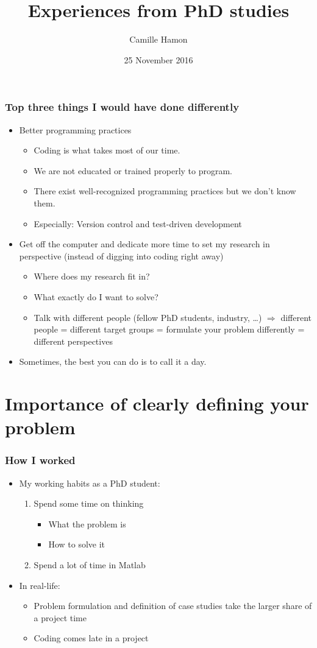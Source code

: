 \documentclass[screen, aspectratio=43]{beamer}
\title{Experiences from PhD studies}
\author{Camille Hamon}
\date{25 November 2016}
\begin{document}
\ntnutitlepage

\begin{frame}
  \frametitle{Top three things I would have done differently}
  \begin{itemize}
  \item Better programming practices
    \begin{itemize}
    \item Coding is what takes most of our time.  
    \item We are not educated or trained properly to program. 
    \item There exist well-recognized programming practices but we don’t know them.  
    \item Especially: Version control and test-driven development
    \end{itemize}
  \item Get off the computer and dedicate more time to set my research in perspective (instead of digging into coding right away)
    \begin{itemize}
    \item Where does my research fit in? 
    \item What exactly do I want to solve? 
    \item Talk with different people (fellow PhD students, industry, …) $\Rightarrow$ different people = different target groups = formulate your problem differently = different perspectives
    \end{itemize}
  \item Sometimes, the best you can do is to call it a day.
  \end{itemize}
\end{frame}

\section{Importance of clearly defining your problem}
\begin{frame}
  \frametitle{How I worked}
  \begin{itemize}
  \item My working habits as a PhD student:
    \begin{enumerate}
    \item Spend some time on thinking
      \begin{itemize}
      \item What the problem is
      \item How to solve it
      \end{itemize}
    \item Spend a lot of time in Matlab
    \end{enumerate}
  \item In real-life:
    \begin{itemize}
    \item Problem formulation and definition of case studies take the larger share of a project time
    \item Coding comes late in a project
    \end{itemize}
  \end{itemize}
\end{frame}
\end{document}
